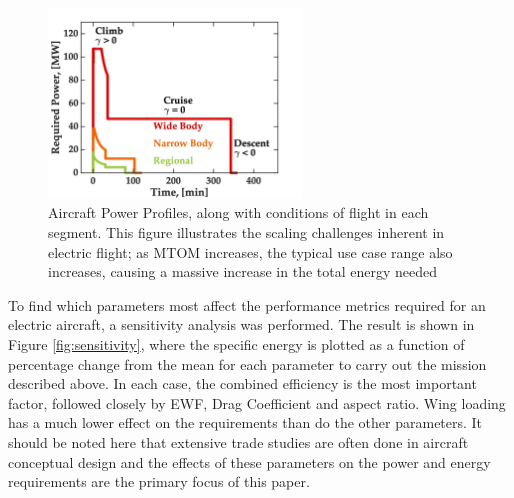 \documentclass{achemso}
\begin{document}
\begin{figure}[htp]
\centering
\includegraphics[width=0.6\textwidth]{Figures/powerprofiles.png}
\caption{Aircraft Power Profiles, along with conditions of flight in each segment. This figure illustrates the scaling challenges inherent in electric flight; as MTOM increases, the typical use case range also increases, causing a massive increase in the total energy needed}
\label{fig:powerprofile}
\end{figure}

To find which parameters most affect the performance metrics required for an electric aircraft, a sensitivity analysis was performed. The result is shown in Figure \ref{fig:sensitivity}, where the specific energy is plotted as a function of percentage change from the mean for each parameter to carry out the mission described above.  In each case, the combined efficiency is the most important factor, followed closely by EWF, Drag Coefficient and aspect ratio. Wing loading has a much lower effect on the requirements than do the other parameters. It should be noted here that extensive trade studies are often done in aircraft conceptual design and the effects of these parameters on the power and energy requirements are the primary focus of this paper.
\end{document}
